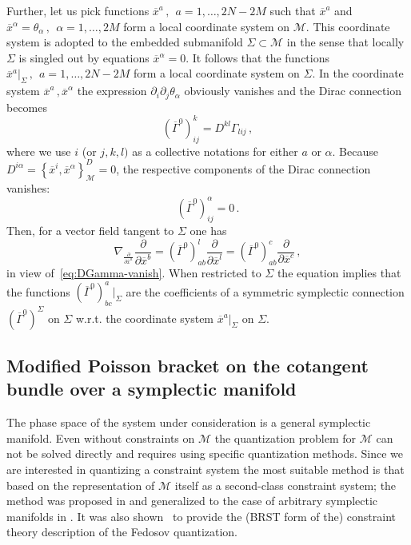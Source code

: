 \documentclass[a4paper,11pt]{amsart}
\numberwithin{thm}{section} %
\numberwithin{equation}{section} %
\numberwithin{figure}{section} %
\newcommand{\pb}[2]{\left\{{}#1{},{}#2{}\right\}}
\renewcommand{\:}{{\rm\, :\,}}
\def\bar{\overline}
\def\d{\partial}
\newcommand{\dl}[1]{\displaystyle\frac{{\d}}{\d #1}}
\def\manM{{\mathcal M}}
\def\con{{\bar\Gamma}}
\begin{document}
Further, let us pick functions
${\bar x}^a\,,~~a=1,\ldots, 2N-2M$
such that ${\bar x}^a$ and
${\bar x}^\alpha=\theta_\alpha\,,~~\alpha=1,\ldots, 2M$ form a local
coordinate system on $\manM$.  This coordinate system
is adopted to the embedded submanifold $\Sigma \subset \manM$
in the sense that locally $\Sigma$ is singled out by equations
${\bar x}^\alpha=0$.  It follows that the functions
${\bar x}^a|_{\Sigma}\,,~~a=1,\ldots, 2N-2M$ form
a local coordinate system on $\Sigma$.  In the coordinate system
${\bar x}^a\,,{\bar x}^\alpha$ the expression $\d_i\d_j \theta_\alpha$
obviously vanishes and the Dirac connection becomes
\begin{equation}
{(\con^0)}^k_{ij}=D^{kl}\Gamma_{lij}\,,
\end{equation}
where we use $i$ (or $j,k,l)$ as a collective notations for either $a$
or $\alpha$.  Because
$D^{i\alpha}=\pb{{\bar x}^i}{{\bar x}^\alpha}^D_{\manM}=0$,
the respective components of the Dirac connection
vanishes:
\begin{equation}
\label{eq:DGamma-vanish}
  (\con^0)^\alpha_{ij}=0\,.
\end{equation}
Then, for a vector field tangent to $\Sigma$ one has
\begin{equation}
\nabla_{\frac{\d}{\d {\bar x}^a}}\dl{{\bar x}^b}=
(\con^0)^l_{ab}\dl{{\bar x}^l}=
(\con^0)^c_{ab}\dl{{\bar x}^c}\,,
\end{equation}
in view of~\eqref{eq:DGamma-vanish}.  When restricted to $\Sigma$
the equation implies that the functions $(\con^0)^a_{bc}{\big|}_{\Sigma}$
are the coefficients of a symmetric symplectic connection
$(\con^0)^\Sigma$ on $\Sigma$ w.r.t. the coordinate system
${\bar x}^a{\bigr|}_\Sigma$ on $\Sigma$.



\subsection{Modified Poisson bracket on the cotangent bundle over
a symplectic manifold}\label{subsec:mod}
The phase space of the system under consideration is a general symplectic
manifold.  Even without constraints on $\manM$ the quantization problem
for $\manM$ can not be solved directly and requires using specific
quantization methods.  Since we are interested in quantizing
a constraint system the most suitable method is that based on the
representation of $\manM$ itself as a second-class constraint
system; the method was proposed in \cite{[BF89]} and generalized
to the case of arbitrary symplectic manifolds in \cite{[GL]}.  It
was also shown~\cite{[GL]} to provide the (BRST form of the)
constraint theory description of the Fedosov quantization.
\end{document}
